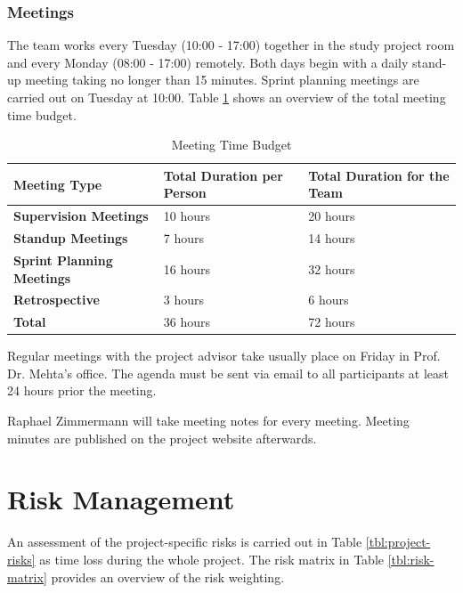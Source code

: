 \subsection{Meetings}

The team works every Tuesday (10:00 - 17:00) together in the study project room and every Monday (08:00 - 17:00) remotely. Both days begin with a daily stand-up meeting taking no longer than 15 minutes. Sprint planning meetings are carried out on Tuesday at 10:00. Table \ref{meeting-time-budget} shows an overview of the total meeting time budget.

\begin{table}[h]
	\centering
	\caption{Meeting Time Budget}
	\label{meeting-time-budget}
	\begin{tabular}{lll}
		\hline
		\textbf{Meeting Type}             & \textbf{Total Duration per Person} & \textbf{Total Duration for the Team} \\ \hline
		\textbf{Supervision Meetings}     & 10 hours                           & 20 hours                             \\
		\textbf{Standup Meetings}         & 7 hours                            & 14 hours                             \\
		\textbf{Sprint Planning Meetings} & 16 hours                           & 32 hours                             \\
		\textbf{Retrospective}            & 3 hours                            & 6 hours                              \\ \hline
		\textbf{Total}                    & 36 hours                           & 72 hours
	\end{tabular}
\end{table}

Regular meetings with the project advisor take usually place on Friday in Prof. Dr. Mehta's office. The agenda must be sent via email to all participants at least 24 hours prior the meeting.

Raphael Zimmermann will take meeting notes for every meeting. Meeting minutes are published on the project website afterwards.

\chapter{Risk Management}

An assessment of the project-specific risks is carried out in Table \ref{tbl:project-risks} as time loss during the whole project. The risk matrix in Table \ref{tbl:risk-matrix} provides an overview of the risk weighting.


